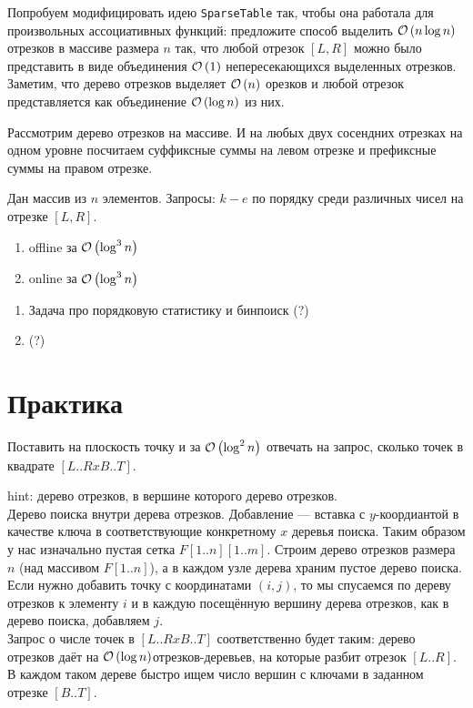 \begin{task}[5]
Попробуем модифицировать идею \texttt{SparseTable} так, чтобы она работала для произвольных ассоциативных функций: предложите способ выделить $\mathcal{O}\left(n\log{n}\right)$ отрезков в массиве размера $n$ так, что любой отрезок $[L,R]$ можно было представить в виде объединения $\mathcal{O}\left(1\right)$ непересекающихся выделенных отрезков. Заметим, что дерево отрезков выделяет $\mathcal{O}\left(n\right)$ орезков и любой отрезок представляется как объединение $\mathcal{O}\left(\log{n}\right)$ из них.
\end{task}
\begin{solution}
Рассмотрим дерево отрезков на массиве. И на любых двух сосендних отрезках на одном уровне посчитаем суффиксные суммы на левом отрезке и префиксные суммы на правом отрезке.
\end{solution}

\begin{task}[6]
Дан массив из $n$ элементов. Запросы: $k-e$ по порядку среди различных чисел на отрезке $[L,R]$.
\begin{enumerate}[label=(\alph*)]
	\item offline за $\mathcal{O}\left(\log^3{n}\right)$
	\item online за $\mathcal{O}\left(\log^3{n}\right)$
\end{enumerate}
\end{task}
\begin{solution}
\begin{enumerate}[label=(\alph*)]
	\item Задача про порядковую статистику и бинпоиск (?)
	\item (?)
\end{enumerate}
\end{solution}

\section{Практика}
\begin{task}[1]
Поставить на плоскость точку и за $\mathcal{O}\left(\log^2{n}\right)$ отвечать на запрос, сколько точек в квадрате $[L..R x B..T]$.
\end{task}
\begin{solution}
hint: дерево отрезков, в вершине которого дерево отрезков.\\
Дерево поиска внутри дерева отрезков. Добавление --- вставка с $y$-коордиантой в качестве ключа в соответствующие конкретному $x$ деревья поиска.
Таким образом у нас изначально пустая сетка $F[1..n][1..m]$. Строим дерево отрезков размера $n$ (над массивом $F[1..n]$), а в каждом узле дерева храним пустое дерево поиска. Если нужно добавить точку с координатами $(i, j)$, то мы спусаемся по дереву отрезков к элементу $i$ и в каждую посещённую вершину дерева отрезков, как в дерево поиска, добавляем $j$.\\
Запрос о числе точек в $[L..R x B..T]$ соответственно будет таким: дерево отрезков даёт на $\mathcal{O}\left(\log{n}\right)$отрезков-деревьев, на которые разбит отрезок $[L..R]$. В каждом таком дереве быстро ищем число вершин с ключами в заданном отрезке $[B..T]$. \xqed
\end{solution}

